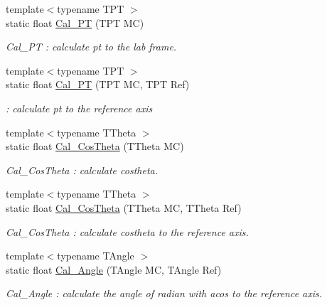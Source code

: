 \begin{DoxyCompactItemize}
{\footnotesize template$<$typename TPT $>$ }\\static float \hyperlink{classToolSet_1_1CMC_ac479ce63e1328c284ef104449b30d465}{Cal\_\-PT} (TPT MC)
\begin{DoxyCompactList}\small\item\em Cal\_\-PT : calculate pt to the lab frame. \item\end{DoxyCompactList}\item 
{\footnotesize template$<$typename TPT $>$ }\\static float \hyperlink{classToolSet_1_1CMC_a8c4c04395c95a6c513f049029c157a7d}{Cal\_\-PT} (TPT MC, TPT Ref)
\begin{DoxyCompactList}\small\item\em : calculate pt to the reference axis \item\end{DoxyCompactList}\item 
{\footnotesize template$<$typename TTheta $>$ }\\static float \hyperlink{classToolSet_1_1CMC_a7142700aa3c1b586b976e9d71301c7bc}{Cal\_\-CosTheta} (TTheta MC)
\begin{DoxyCompactList}\small\item\em Cal\_\-CosTheta : calculate costheta. \item\end{DoxyCompactList}\item 
{\footnotesize template$<$typename TTheta $>$ }\\static float \hyperlink{classToolSet_1_1CMC_a91c74f61d1c9656e68f4b1037976a51b}{Cal\_\-CosTheta} (TTheta MC, TTheta Ref)
\begin{DoxyCompactList}\small\item\em Cal\_\-CosTheta : calculate costheta to the reference axis. \item\end{DoxyCompactList}\item 
{\footnotesize template$<$typename TAngle $>$ }\\static float \hyperlink{classToolSet_1_1CMC_a0637a061bf4ecd9084b794023cc11816}{Cal\_\-Angle} (TAngle MC, TAngle Ref)
\begin{DoxyCompactList}\small\item\em Cal\_\-Angle : calculate the angle of radian with acos to the reference axis. \item\end{DoxyCompactList}\item 

\end{DoxyCompactItemize}
